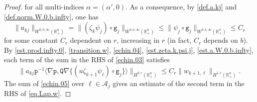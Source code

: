 \documentclass[10pt,reqno,a4paper]{article}
\numberwithin{equation}{section}
\theoremstyle{plain}
\theoremstyle{definition}
\newcommand{\R}{{\mathbb R}}
\newcommand{\mA}{\mathcal{A}}
\renewcommand{\a}{\alpha}
\newcommand{\la}{\langle}
\newcommand{\ra}{\rangle}
\newcommand{\grad}{\nabla}
\begin{document}
\begin{proof}
for all multi-indices $\a = (\a', 0)$. 
As a consequence, by \eqref{def.a.kj} and \eqref{def.norm.W.0.b.infty}, one has
\begin{equation}  \label{est.a.W.0.b.infty}
\| a_{kj} \|_{W^{0,b,\infty}(\R^n_+)}
= \| (\zeta_k \psi_j) \circ \mathtt g_j \|_{W^{0,b,\infty}(\R^n_+)}
\leq \| \psi_j \circ \mathtt g_j \|_{W^{0,b,\infty}(\R^n_+)} \leq C_r
\end{equation}
for some constant $C_r$ 
dependent on $r$, increasing in $r$ (in fact, $C_r$ depends on $b$).  
By \eqref{est.prod.infty.0}, \eqref{transition.w}, \eqref{echin.04}, 
\eqref{est.zeta.k.psi.j}, \eqref{est.a.W.0.b.infty}, 
each term of the sum in the RHS of \eqref{echin.03} satisfies 
\begin{equation}  \label{echin.05}
\| a_{kj} \mathtt p^{-1} \la \grad \mathtt p , \mathtt Q \grad 
\{ (u \zeta_{k+1} \psi_\ell) \circ \mathtt g_j \} \ra \|_{H^{0,r}(\R^n_+)}
\leq C_r \| w_{k+1,\ell} \|_{H^{1,r}(\R^n_+)}.
\end{equation}
The sum of \eqref{echin.05} over $\ell \in \mA_j$ gives an estimate 
of the second term in the RHS of \eqref{eq.Lap.w}.


\end{proof}
\end{document}
